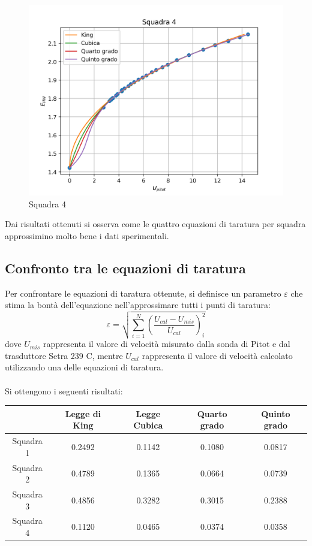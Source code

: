 \begin{figure}[H]
    \centering
    \includegraphics[width=.8\textwidth]{images/8/sq4.png}
    \caption{Squadra 4}
\end{figure}

\noindent Dai risultati ottenuti si osserva come le quattro equazioni di taratura per squadra approssimino molto bene i dati sperimentali.

\newpage
\subsection{Confronto tra le equazioni di taratura}
Per confrontare le equazioni di taratura ottenute, si definisce un parametro $\varepsilon$ che stima la bontà dell'equazione nell'approssimare tutti i punti di taratura:
\begin{equation*}
    \varepsilon = \sqrt{\sum_{i=1}^N\left( \frac{U_{cal}-U_{mis}}{U_{cal}} \right)_i^2}
\end{equation*}
dove $U_{mis}$ rappresenta il valore di velocità misurato dalla sonda di Pitot e dal trasduttore Setra 239 C, mentre $U_{cal}$ rappresenta il valore di velocità calcolato utilizzando una delle equazioni di taratura.\\\\
Si ottengono i seguenti risultati:
\begin{table}[h]
    \centering
    \begin{tabular}{|c|c|c|c|c|}
    \hline
              & Legge di King & Legge Cubica & Quarto grado & Quinto grado \\ \hline
    Squadra 1 & 0.2492        & 0.1142       & 0.1080       & 0.0817       \\ \hline
    Squadra 2 & 0.4789        & 0.1365       & 0.0664       & 0.0739       \\ \hline
    Squadra 3 & 0.4856        & 0.3282       & 0.3015       & 0.2388       \\ \hline
    Squadra 4 & 0.1120        & 0.0465       & 0.0374       & 0.0358       \\ \hline
    \end{tabular}
\end{table}

